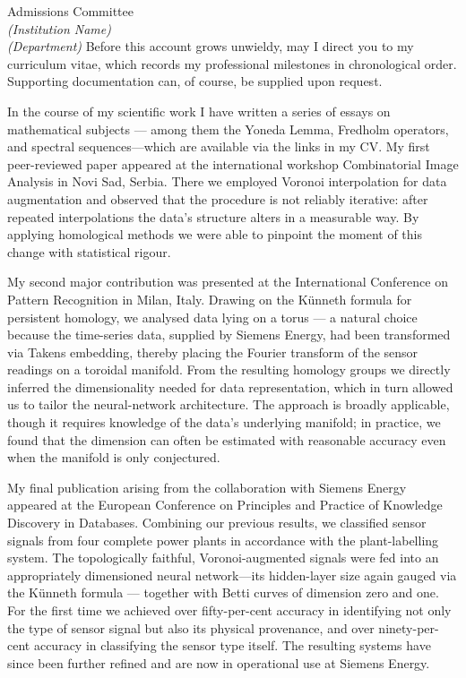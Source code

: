 \documentclass[11pt]{letter}
\begin{document}
\begin{letter}{%
Admissions Committee\\[2pt]%
\textit{(Institution Name)}\\%
\textit{(Department)}}
Before this account grows unwieldy, may I direct you to my curriculum vitae, which records my professional milestones in chronological order. Supporting documentation can, of course, be supplied upon request.

In the course of my scientific work I have written a series of essays on mathematical subjects — among them the Yoneda Lemma, Fredholm operators, and spectral sequences—which are available via the links in my CV. My first peer-reviewed paper appeared at the international workshop Combinatorial Image Analysis in Novi Sad, Serbia. There we employed Voronoi interpolation for data augmentation and observed that the procedure is not reliably iterative: after repeated interpolations the data’s structure alters in a measurable way. By applying homological methods we were able to pinpoint the moment of this change with statistical rigour.

My second major contribution was presented at the International Conference on Pattern Recognition in Milan, Italy. Drawing on the Künneth formula for persistent homology, we analysed data lying on a torus — a natural choice because the time-series data, supplied by Siemens Energy, had been transformed via Takens embedding, thereby placing the Fourier transform of the sensor readings on a toroidal manifold. From the resulting homology groups we directly inferred the dimensionality needed for data representation, which in turn allowed us to tailor the neural-network architecture. The approach is broadly applicable, though it requires knowledge of the data’s underlying manifold; in practice, we found that the dimension can often be estimated with reasonable accuracy even when the manifold is only conjectured.

My final publication arising from the collaboration with Siemens Energy appeared at the European Conference on Principles and Practice of Knowledge Discovery in Databases. Combining our previous results, we classified sensor signals from four complete power plants in accordance with the plant-labelling system. The topologically faithful, Voronoi-augmented signals were fed into an appropriately dimensioned neural network—its hidden-layer size again gauged via the Künneth formula — together with Betti curves of dimension zero and one. For the first time we achieved over fifty-per-cent accuracy in identifying not only the type of sensor signal but also its physical provenance, and over ninety-per-cent accuracy in classifying the sensor type itself. The resulting systems have since been further refined and are now in operational use at Siemens Energy.


\end{letter}
\end{document}

